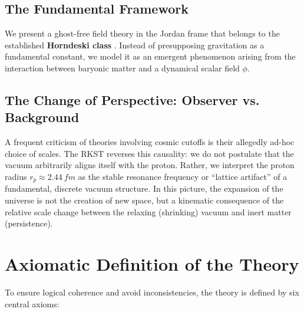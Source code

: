 \documentclass[11pt,a4paper]{article}
\begin{document}
\subsection{The Fundamental Framework}
We present a ghost-free field theory in the Jordan frame that belongs to the established \textbf{Horndeski class} \cite{horndeski}. Instead of presupposing gravitation as a fundamental constant, we model it as an emergent phenomenon arising from the interaction between baryonic matter and a dynamical scalar field $\phi$.

\subsection{The Change of Perspective: Observer vs. Background}
A frequent criticism of theories involving cosmic cutoffs is their allegedly ad-hoc choice of scales. The RKST reverses this causality: we do not postulate that the vacuum arbitrarily aligns itself with the proton. Rather, we interpret the proton radius $r_p \approx \SI{2.44}{fm}$ as the stable resonance frequency or “lattice artifact” of a fundamental, discrete vacuum structure.  
In this picture, the expansion of the universe is not the creation of new space, but a kinematic consequence of the relative scale change between the relaxing (shrinking) vacuum and inert matter (persistence).

\section{Axiomatic Definition of the Theory}
\label{sec:axioms}

To ensure logical coherence and avoid inconsistencies, the theory is defined by six central axioms:
\end{document}
